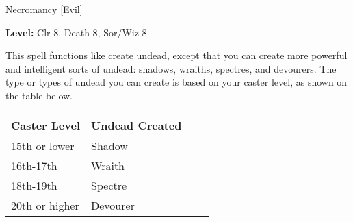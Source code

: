 
Necromancy [Evil]

\textbf{Level:} Clr 8, Death 8, Sor/Wiz 8

This spell functions like create undead, except that you can create more powerful 
and intelligent sorts of undead: shadows, wraiths, spectres, and devourers. The 
type or types of undead you can create is based on your caster level, as shown 
on the table below.

\begin{longtable}{llll}
\hline
\multicolumn{1}{|p{0.938in}|}{\begin{minipage}[t]{0.938in}\raggedright
\textbf{Caster Level}\end{minipage}} & \multicolumn{1}{p{1.126in}|}{\begin{minipage}[t]{1.126in}\raggedright
\textbf{Undead Created}\end{minipage}}\\
\hline
\multicolumn{1}{p{0.069in}|}{\begin{minipage}[t]{0.069in}\raggedright
15th or lower\end{minipage}} & \multicolumn{1}{p{0.069in}|}{\begin{minipage}[t]{0.069in}\raggedright
Shadow\end{minipage}}\\
\hline
\multicolumn{1}{|p{0.938in}|}{\begin{minipage}[t]{0.938in}\raggedright
16th-17th\end{minipage}} & \multicolumn{1}{p{1.126in}|}{\begin{minipage}[t]{1.126in}\raggedright
Wraith\end{minipage}}\\
\hline
\multicolumn{1}{p{0.069in}|}{\begin{minipage}[t]{0.069in}\raggedright
18th-19th\end{minipage}} & \multicolumn{1}{p{0.069in}|}{\begin{minipage}[t]{0.069in}\raggedright
Spectre\end{minipage}}\\
\hline
\multicolumn{1}{|p{0.938in}|}{\begin{minipage}[t]{0.938in}\raggedright
20th or higher\end{minipage}} & \multicolumn{3}{p{1.265in}|}{\begin{minipage}[t]{1.265in}\raggedright
Devourer\end{minipage}}\\
\hline
\end{longtable}


